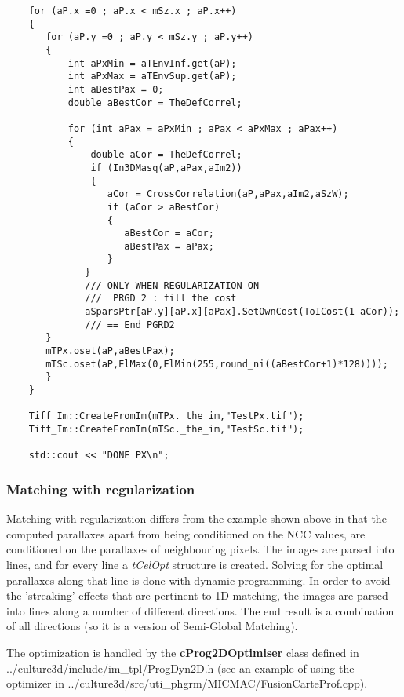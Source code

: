 \begin{lstlisting}
	for (aP.x =0 ; aP.x < mSz.x ; aP.x++)
	{
	   for (aP.y =0 ; aP.y < mSz.y ; aP.y++)
	   {
		   int aPxMin = aTEnvInf.get(aP);
		   int aPxMax = aTEnvSup.get(aP);
		   int aBestPax = 0;
		   double aBestCor = TheDefCorrel;

		   for (int aPax = aPxMin ; aPax < aPxMax ; aPax++)
		   {
			   double aCor = TheDefCorrel;
			   if (In3DMasq(aP,aPax,aIm2))
			   {
			      aCor = CrossCorrelation(aP,aPax,aIm2,aSzW);
			      if (aCor > aBestCor)
			      {
				     aBestCor = aCor;
				     aBestPax = aPax;
			      }
		      }
		      /// ONLY WHEN REGULARIZATION ON
		      ///  PRGD 2 : fill the cost
		      aSparsPtr[aP.y][aP.x][aPax].SetOwnCost(ToICost(1-aCor));
		      /// == End PGRD2
	   }
	   mTPx.oset(aP,aBestPax);
	   mTSc.oset(aP,ElMax(0,ElMin(255,round_ni((aBestCor+1)*128))));
	   }
	}

	Tiff_Im::CreateFromIm(mTPx._the_im,"TestPx.tif");
	Tiff_Im::CreateFromIm(mTSc._the_im,"TestSc.tif");

	std::cout << "DONE PX\n";

\end{lstlisting}



\subsubsection{Matching with regularization}
Matching with regularization differs from the example shown above in that the computed parallaxes apart from being conditioned on the NCC values, are conditioned on the parallaxes of neighbouring pixels. The images are parsed into lines, and for every line a \emph{tCelOpt }structure is created. Solving for the optimal parallaxes along that line is done with dynamic programming. In order to avoid the 'streaking' effects that are pertinent to 1D matching, the images are parsed into lines along a number of different directions. The end result is a combination of all directions (so it is a version of Semi-Global Matching).\newline

The optimization is handled by the \textbf{cProg2DOptimiser} class defined in ../culture3d/include/\-im\_tpl/ProgDyn2D.h (see an example of using the optimizer in ../culture3d/src/uti\_phgrm/MICMAC/\-FusionCarteProf.cpp).\newline

